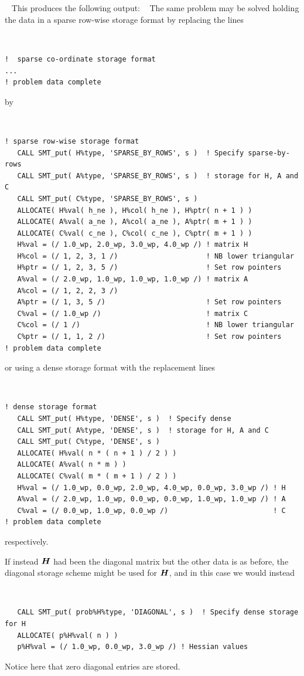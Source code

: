 \documentclass{galahad}
\begin{document}
{\tt \small
\VerbatimInput{\packageexample}
}
\noindent
This produces the following output:
{\tt \small
\VerbatimInput{\packageresults}
}
\noindent
The same problem may be solved holding the data in
a sparse row-wise storage format by replacing the lines
{\tt \small
\begin{verbatim}
!  sparse co-ordinate storage format
...
! problem data complete
\end{verbatim}
}
\noindent
by
{\tt \small
\begin{verbatim}
! sparse row-wise storage format
   CALL SMT_put( H%type, 'SPARSE_BY_ROWS', s )  ! Specify sparse-by-rows
   CALL SMT_put( A%type, 'SPARSE_BY_ROWS', s )  ! storage for H, A and C
   CALL SMT_put( C%type, 'SPARSE_BY_ROWS', s )
   ALLOCATE( H%val( h_ne ), H%col( h_ne ), H%ptr( n + 1 ) )
   ALLOCATE( A%val( a_ne ), A%col( a_ne ), A%ptr( m + 1 ) )
   ALLOCATE( C%val( c_ne ), C%col( c_ne ), C%ptr( m + 1 ) )
   H%val = (/ 1.0_wp, 2.0_wp, 3.0_wp, 4.0_wp /) ! matrix H
   H%col = (/ 1, 2, 3, 1 /)                     ! NB lower triangular
   H%ptr = (/ 1, 2, 3, 5 /)                     ! Set row pointers
   A%val = (/ 2.0_wp, 1.0_wp, 1.0_wp, 1.0_wp /) ! matrix A
   A%col = (/ 1, 2, 2, 3 /)
   A%ptr = (/ 1, 3, 5 /)                        ! Set row pointers
   C%val = (/ 1.0_wp /)                         ! matrix C
   C%col = (/ 1 /)                              ! NB lower triangular
   C%ptr = (/ 1, 1, 2 /)                        ! Set row pointers
! problem data complete
\end{verbatim}
}
\noindent
or using a dense storage format with the replacement lines
{\tt \small
\begin{verbatim}
! dense storage format
   CALL SMT_put( H%type, 'DENSE', s )  ! Specify dense
   CALL SMT_put( A%type, 'DENSE', s )  ! storage for H, A and C
   CALL SMT_put( C%type, 'DENSE', s )
   ALLOCATE( H%val( n * ( n + 1 ) / 2 ) )
   ALLOCATE( A%val( n * m ) )
   ALLOCATE( C%val( m * ( m + 1 ) / 2 ) )
   H%val = (/ 1.0_wp, 0.0_wp, 2.0_wp, 4.0_wp, 0.0_wp, 3.0_wp /) ! H
   A%val = (/ 2.0_wp, 1.0_wp, 0.0_wp, 0.0_wp, 1.0_wp, 1.0_wp /) ! A
   C%val = (/ 0.0_wp, 1.0_wp, 0.0_wp /)                         ! C
! problem data complete
\end{verbatim}
}
\noindent
respectively.

If instead ${\bm{H}}$ had been the diagonal matrix
but the other data is as before, the diagonal storage scheme
might be used for ${\bm{H}}$, and in this case we would instead
{\tt \small
\begin{verbatim}
   CALL SMT_put( prob%H%type, 'DIAGONAL', s )  ! Specify dense storage for H
   ALLOCATE( p%H%val( n ) )
   p%H%val = (/ 1.0_wp, 0.0_wp, 3.0_wp /) ! Hessian values
\end{verbatim}
}
\noindent
Notice here that zero diagonal entries are stored.
\end{document}
